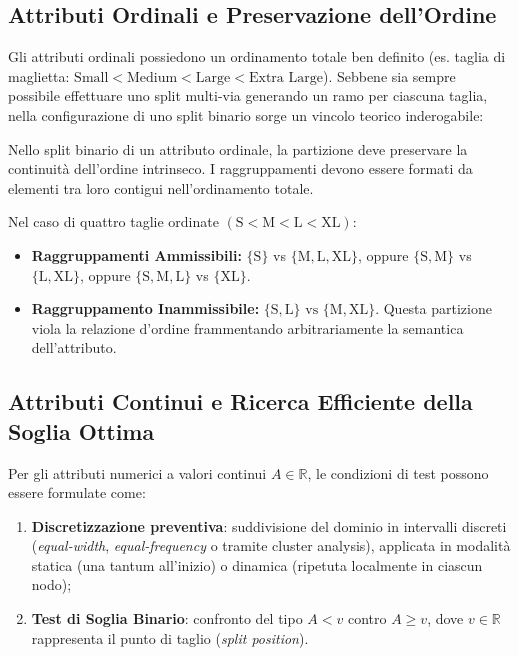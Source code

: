 \FloatBarrier
\subsection{Attributi Ordinali e Preservazione dell'Ordine}
\label{subsec:dm-test-ordinal}

Gli attributi ordinali possiedono un ordinamento totale ben definito (es. taglia di maglietta: $\text{Small} < \text{Medium} < \text{Large} < \text{Extra Large}$). Sebbene sia sempre possibile effettuare uno split multi-via generando un ramo per ciascuna taglia, nella configurazione di uno split binario sorge un vincolo teorico inderogabile:

\begin{theorem}
Nello split binario di un attributo ordinale, la partizione deve preservare la continuità dell'ordine intrinseco. I raggruppamenti devono essere formati da elementi tra loro contigui nell'ordinamento totale.
\end{theorem}

Nel caso di quattro taglie ordinate $(\text{S} < \text{M} < \text{L} < \text{XL})$:
\begin{itemize}
    \item \textbf{Raggruppamenti Ammissibili:} $\{\text{S}\}$ vs $\{\text{M}, \text{L}, \text{XL}\}$, oppure $\{\text{S}, \text{M}\}$ vs $\{\text{L}, \text{XL}\}$, oppure $\{\text{S}, \text{M}, \text{L}\}$ vs $\{\text{XL}\}$.
    \item \textbf{Raggruppamento Inammissibile:} $\{\text{S}, \text{L}\} \text{ vs } \{\text{M}, \text{XL}\}$. Questa partizione viola la relazione d'ordine frammentando arbitrariamente la semantica dell'attributo.
\end{itemize}

\FloatBarrier
\subsection{Attributi Continui e Ricerca Efficiente della Soglia Ottima}
\label{subsec:dm-test-continuous}

Per gli attributi numerici a valori continui $A \in \mathbb{R}$, le condizioni di test possono essere formulate come:
\begin{enumerate}
    \item \textbf{Discretizzazione preventiva}: suddivisione del dominio in intervalli discreti (\textit{equal-width}, \textit{equal-frequency} o tramite cluster analysis), applicata in modalità statica (una tantum all'inizio) o dinamica (ripetuta localmente in ciascun nodo);
    \item \textbf{Test di Soglia Binario}: confronto del tipo $A < v$ contro $A \ge v$, dove $v \in \mathbb{R}$ rappresenta il punto di taglio (\textit{split position}).
\end{enumerate}

